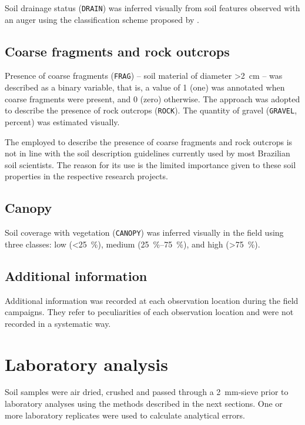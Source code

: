 Soil drainage status (\texttt{DRAIN}) was inferred visually from soil features observed with an 
auger using the classification scheme proposed by .

\tocless\subsection{Coarse fragments and rock outcrops}

Presence of coarse fragments (\texttt{FRAG}) -- soil material of diameter \SI{>2}{\centi\metre} -- was 
described 
as a binary variable, that is, a value of \num{1} (one) was annotated when coarse fragments were present, and 
\num{0} (zero) otherwise. The approach was adopted to describe the presence of rock outcrops (\texttt{ROCK}). 
The 
quantity of gravel (\texttt{GRAVEL}, \si{percent}) was estimated visually.

The employed to describe the presence of coarse fragments and rock outcrops is not in line with the soil 
description guidelines currently used by most Brazilian soil scientists. The reason for its use is the limited 
importance given to these soil properties in the respective research projects.

\tocless\subsection{Canopy}

Soil coverage with vegetation (\texttt{CANOPY}) was inferred visually in the field using three classes: 
low (\SI{<25}{\percent}), medium (\SIrange{25}{75}{\percent}), and high (\SI{>75}{\percent}).

\tocless\subsection{Additional information}

Additional information was recorded at each observation location during the field campaigns. They refer to 
peculiarities of each observation location and were not recorded in a systematic way.

\tocless\section{Laboratory analysis}

Soil samples were air dried, crushed and passed through a \SI{2}{\milli\metre}-sieve prior to laboratory 
analyses using the methods described in the next sections. One or more laboratory replicates were used to 
calculate analytical errors.

